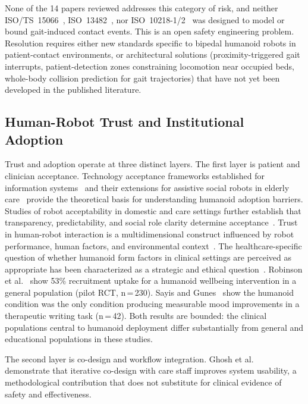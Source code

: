 \documentclass[acmjour]{acmart}
\begin{document}
None of the 14 papers reviewed addresses this category of risk, and neither
ISO/TS~15066~\cite{isots15066}, ISO~13482~\cite{iso13482}, nor
ISO~10218-1/2~\cite{iso10218_1,iso10218_2} was designed to model or bound
gait-induced contact events. This is an open safety engineering problem.
Resolution requires either new standards specific to bipedal humanoid robots in
patient-contact environments, or architectural solutions (proximity-triggered
gait interrupts, patient-detection zones constraining locomotion near occupied
beds, whole-body collision prediction for gait trajectories) that have not yet
been developed in the published literature.

\subsection{Human-Robot Trust and Institutional Adoption}
\label{sec:trust}

Trust and adoption operate at three distinct layers. The first layer is patient
and clinician acceptance. Technology acceptance frameworks established for
information systems~\cite{venkatesh2003user} and their extensions for assistive
social robots in elderly care~\cite{heerink2010assessing,broadbent2017interactions}
provide the theoretical basis for understanding humanoid adoption barriers.
Studies of robot acceptability in domestic and care settings further establish
that transparency, predictability, and social role clarity determine
acceptance~\cite{young2009toward}.
Trust in human-robot interaction is a multidimensional construct influenced by
robot performance, human factors, and environmental
context~\cite{hancock2011meta,hancock2011trust,sciutti2018humanizing}. The healthcare-specific question of whether
humanoid form factors in clinical settings are perceived as appropriate has been
characterized as a strategic and ethical
question~\cite{ozturkcan2022humanoid}. Robinson et al.~\cite{robinson2023brief}
show 53\% recruitment uptake for a humanoid wellbeing intervention in a general
population (pilot RCT, n\,=\,230). Sayis and Gunes~\cite{sayis2024technology}
show the humanoid condition was the only condition producing measurable mood
improvements in a therapeutic writing task (n\,=\,42). Both results are bounded:
the clinical populations central to humanoid deployment differ substantially from
general and educational populations in these studies.

The second layer is co-design and workflow integration. Ghosh et
al.~\cite{ghosh2024usercentered} demonstrate that iterative co-design with care
staff improves system usability, a methodological contribution that does not
substitute for clinical evidence of safety and effectiveness.
\end{document}
